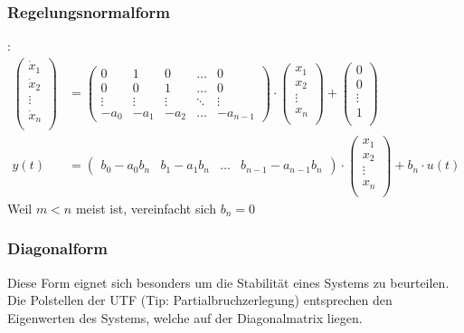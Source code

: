 \subsubsection{Regelungsnormalform}
:
\begin{align*}
 \begin{pmatrix}  \dot{x}_1 \\ 	\dot{x}_2 \\ \vdots \\ \dot{x}_n \\ \end{pmatrix}
 &=
 \begin{pmatrix}
 	0 & 1 & 0 & \dots & 0\\
 	0 & 0 & 1 & \dots & 0\\
 	\vdots & \vdots & \vdots & \ddots & \vdots \\
 	-a_0 & -a_1 & -a_2 & \dots & -a_{n-1}
 \end{pmatrix}\cdot
\begin{pmatrix}  {x}_1 \\ 	{x}_2 \\ \vdots\\ {x}_n \\ \end{pmatrix} +
\begin{pmatrix}  0 \\ 0 \\ \vdots \\1 \\ \end{pmatrix}
\\
y(t) &= \begin{pmatrix}
	b_0-a_0b_n & b_1 - a_1b_n & \dots & b_{n-1}-a_{n-1}b_n
\end{pmatrix}\cdot
\begin{pmatrix}  {x}_1 \\ 	{x}_2 \\ \vdots\\ {x}_n \\ \end{pmatrix}
+ {b_n}\cdot u(t)
\end{align*}
Weil $m<n$ meist ist, vereinfacht sich $b_n = 0$

\subsubsection{Diagonalform}\label{diag}
Diese Form eignet sich besonders um die Stabilität eines Systems zu beurteilen.
\todo{}
Die Polstellen der UTF (Tip: Partialbruchzerlegung) entsprechen den Eigenwerten des Systems, welche auf der Diagonalmatrix liegen.

